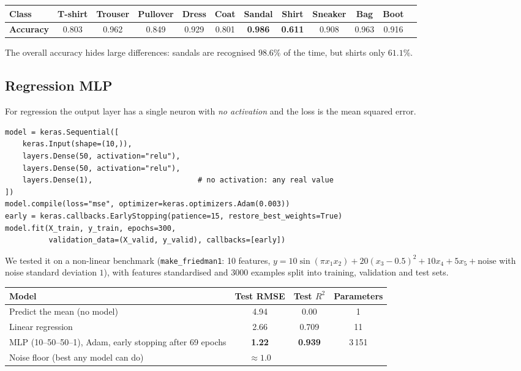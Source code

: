 \begin{center}
\small
\begin{tabular}{@{}lccccccccccc@{}}
\toprule
\textbf{Class} & T-shirt & Trouser & Pullover & Dress & Coat & Sandal & Shirt & Sneaker & Bag & Boot\\
\midrule
\textbf{Accuracy} & 0.803 & 0.962 & 0.849 & 0.929 & 0.801 & \textbf{0.986} & \textbf{0.611} & 0.908 & 0.963 & 0.916\\
\bottomrule
\end{tabular}
\end{center}

\noindent The overall accuracy hides large differences: sandals are recognised $98.6\%$ of the time, but shirts only $61.1\%$.

\subsection{Regression MLP}

For regression the output layer has a single neuron with \emph{no activation} and the loss is the mean squared error.

\begin{lstlisting}
model = keras.Sequential([
    keras.Input(shape=(10,)),
    layers.Dense(50, activation="relu"),
    layers.Dense(50, activation="relu"),
    layers.Dense(1),                        # no activation: any real value
])
model.compile(loss="mse", optimizer=keras.optimizers.Adam(0.003))
early = keras.callbacks.EarlyStopping(patience=15, restore_best_weights=True)
model.fit(X_train, y_train, epochs=300,
          validation_data=(X_valid, y_valid), callbacks=[early])
\end{lstlisting}

We tested it on a non-linear benchmark (\texttt{make\_friedman1}: 10 features, $y=10\sin(\pi x_1x_2)+20(x_3-0.5)^2+10x_4+5x_5+\text{noise}$ with noise standard deviation $1$), with features standardised and $3000$ examples split into training, validation and test sets.

\begin{center}
\begin{tabular}{@{}lccc@{}}
\toprule
\textbf{Model} & \textbf{Test RMSE} & \textbf{Test $R^2$} & \textbf{Parameters}\\
\midrule
Predict the mean (no model) & 4.94 & 0.00 & 1\\
Linear regression & 2.66 & 0.709 & 11\\
MLP (10--50--50--1), Adam, early stopping after 69 epochs & \textbf{1.22} & \textbf{0.939} & 3\,151\\
\midrule
Noise floor (best any model can do) & $\approx1.0$ & & \\
\bottomrule
\end{tabular}
\end{center}

